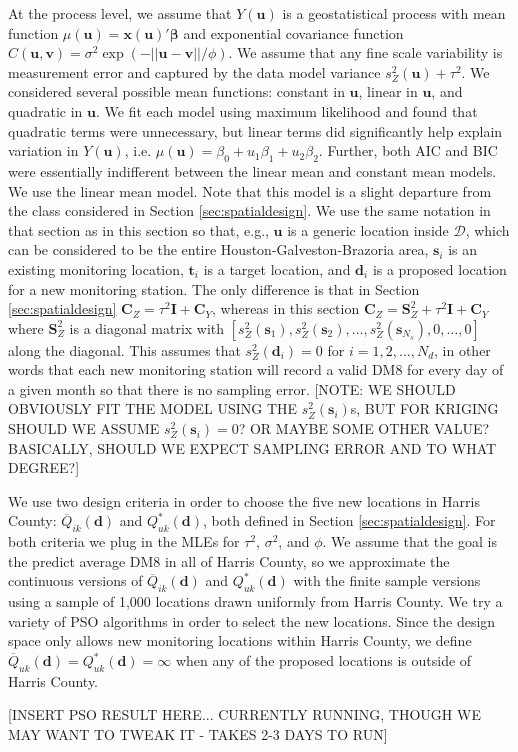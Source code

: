 \documentclass[12pt]{article}
\begin{document}
At the process level, we assume that $Y(\bm{u})$ is a geostatistical process with mean function $\mu(\bm{u}) = \bm{x}(\bm{u})'\bm{\beta}$ and exponential covariance function $C(\bm{u},\bm{v}) = \sigma^2\exp(-||\bm{u} - \bm{v}||/\phi)$. We assume that any fine scale variability is measurement error and captured by the data model variance $s_Z^2(\bm{u}) + \tau^2$. We considered several possible mean functions: constant in $\bm{u}$, linear in $\bm{u}$, and quadratic in $\bm{u}$. We fit each model using maximum likelihood and found that quadratic terms were unnecessary, but linear terms did significantly help explain variation in $Y(\bm{u})$, i.e. $\mu(\bm{u}) = \beta_0 + u_1\beta_1 + u_2\beta_2$. Further, both AIC and BIC were essentially indifferent between the linear mean and constant mean models. We use the linear mean model. Note that this model is a slight departure from the class considered in Section \ref{sec:spatialdesign}. We use the same notation in that section as in this section so that, e.g., $\bm{u}$ is a generic location inside $\mathcal{D}$, which can be considered to be the entire Houston-Galveston-Brazoria area, $\bm{s}_i$ is an existing monitoring location, $\bm{t}_i$ is a target location, and $\bm{d}_i$ is a proposed location for a new monitoring station. The only difference is that in Section \ref{sec:spatialdesign} $\bm{C}_Z = \tau^2\bm{I} + \bm{C}_Y$, whereas in this section $\bm{C}_Z = \bm{S}_Z^2 + \tau^2\bm{I} + \bm{C}_Y$ where $\bm{S}_Z^2$ is a diagonal matrix with $[s_Z^2(\bm{s}_1), s_Z^2(\bm{s}_2), \dots, s_Z^2(\bm{s}_{N_s}), 0, \dots, 0]$ along the diagonal. This assumes that $s_Z^2(\bm{d}_i)=0$ for $i=1,2,\dots,N_d$, in other words that each new monitoring station will record a valid DM8 for every day of a given month so that there is no sampling error. [NOTE: WE SHOULD OBVIOUSLY FIT THE MODEL USING THE $s_Z^2(\bm{s}_{i})$s, BUT FOR KRIGING SHOULD WE ASSUME $s_Z^2(\bm{s}_{i})=0$? OR MAYBE SOME OTHER VALUE? BASICALLY, SHOULD WE EXPECT SAMPLING ERROR AND TO WHAT DEGREE?]

We use two design criteria in order to choose the five new locations in Harris County: $\overline{Q}_{ik}(\bm{d})$ and $Q^*_{uk}(\bm{d})$, both defined in Section \ref{sec:spatialdesign}. For both criteria we plug in the MLEs for $\tau^2$, $\sigma^2$, and $\phi$. We assume that the goal is the predict average DM8 in all of Harris County, so we approximate the continuous versions of $\overline{Q}_{ik}(\bm{d})$ and $Q^*_{uk}(\bm{d})$ with the finite sample versions using a sample of 1,000 locations drawn uniformly from Harris County. We try a variety of PSO algorithms in order to select the new locations. Since the design space only allows new monitoring locations within Harris County, we define $\overline{Q}_{uk}(\bm{d})=Q^*_{uk}(\bm{d})=\infty$ when any of the proposed locations is outside of Harris County.

[INSERT PSO RESULT HERE... CURRENTLY RUNNING, THOUGH WE MAY WANT TO TWEAK IT - TAKES 2-3 DAYS TO RUN]


\clearpage\pagebreak\newpage\thispagestyle{empty}


\end{document}

